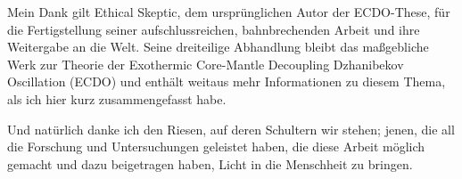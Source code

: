 \documentclass[10pt,twocolumn,letterpaper]{article}
\begin{document}
Mein Dank gilt Ethical Skeptic, dem ursprünglichen Autor der ECDO-These, für die Fertigstellung seiner aufschlussreichen, bahnbrechenden Arbeit und ihre Weitergabe an die Welt. Seine dreiteilige Abhandlung \cite{1} bleibt das maßgebliche Werk zur Theorie der Exothermic Core-Mantle Decoupling Dzhanibekov Oscillation (ECDO) und enthält weitaus mehr Informationen zu diesem Thema, als ich hier kurz zusammengefasst habe.

Und natürlich danke ich den Riesen, auf deren Schultern wir stehen; jenen, die all die Forschung und Untersuchungen geleistet haben, die diese Arbeit möglich gemacht und dazu beigetragen haben, Licht in die Menschheit zu bringen.

\clearpage
\twocolumn

{\small
\renewcommand{\refname}{References}


}
\end{document}
